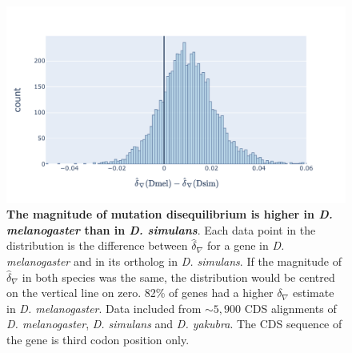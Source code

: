 \begin{figure}[h]
\centering
\includegraphics[width=	\textwidth]{figures/plots/drosophila/d-conv-diff.pdf}
\caption{\textbf{The magnitude of mutation disequilibrium is higher in \textit{D. melanogaster} than in \textit{D. simulans}}. Each data point in the distribution is the difference between $\hat\delta_\nabla$ for a gene in \textit{D. melanogaster} and in its ortholog in \textit{D. simulans}. If the magnitude of $\hat\delta_\nabla$ in both species was the same, the distribution would be centred on the vertical line on zero. 82\% of genes had a higher $\delta_\nabla$ estimate in \textit{D. melanogaster}. Data included from $\sim 5,900$ CDS alignments of \textit{D. melanogaster}, \textit{D. simulans} and \textit{D. yakubra}. The CDS sequence of the gene is third codon position only.}
\label{fig:drosophila_d-conv-diff}
\end{figure}
